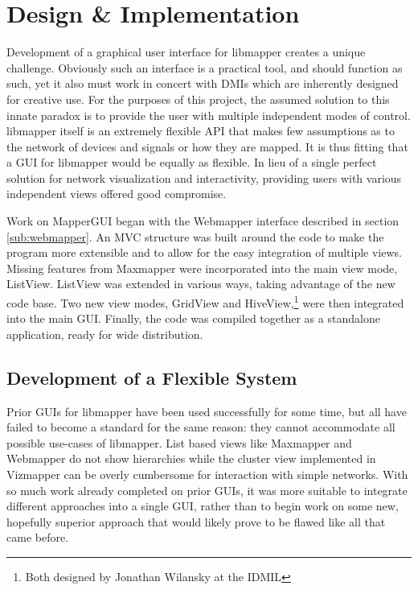 \chapter{Design \& Implementation}

	Development of a graphical user interface for libmapper creates a unique challenge. Obviously such an interface is a practical tool, and should function as such, yet it also must work in concert with DMIs which are inherently designed for creative use. For the purposes of this project, the assumed solution to this innate paradox is to provide the user with multiple independent modes of control.  libmapper itself is an extremely flexible API that makes few assumptions as to the network of devices and signals or how they are mapped. It is thus fitting that a GUI for libmapper would be equally as flexible. In lieu of a single perfect solution for network visualization and interactivity, providing users with various independent views offered good compromise.

	Work on MapperGUI began with the Webmapper interface described in section \ref{sub:webmapper}. An MVC structure was built around the code to make the program more extensible and to allow for the easy integration of multiple views. Missing features from Maxmapper were incorporated into the main view mode, ListView. ListView was extended in various ways, taking advantage of the new code base. Two new view modes, GridView and HiveView,\footnote{Both designed by Jonathan Wilansky at the IDMIL} were then integrated into the main GUI. Finally, the code was compiled together as a standalone application, ready for wide distribution.

\section{Development of a Flexible System} %
\label{sec:development_of_a_flexible_system}

Prior GUIs for libmapper have been used successfully for some time, but all have failed to become a standard for the same reason: they cannot accommodate all possible use-cases of libmapper. List based views like Maxmapper and Webmapper do not show hierarchies while the cluster view implemented in Vizmapper can be overly cumbersome for interaction with simple networks. With so much work already completed on prior GUIs, it was more suitable to integrate different approaches into a single GUI, rather than to begin work on some new, hopefully superior approach that would likely prove to be flawed like all that came before. 


